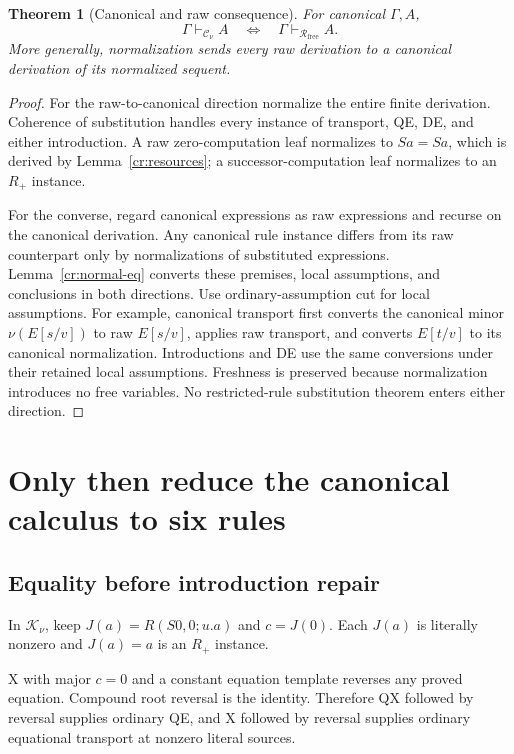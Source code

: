 \documentclass[11pt]{article}
\newtheorem{theorem}{Theorem}[section]
\theoremstyle{definition}\newtheorem{definition}[theorem]{Definition}
\newcommand{\Rfree}{\mathcal R_{\mathrm{free}}}
\newcommand{\Cnorm}{\mathcal C_\nu}
\newcommand{\Knorm}{\mathcal K_\nu}
\begin{document}
\begin{theorem}[Canonical and raw consequence]\label{cr:canonical-equiv}
For canonical \(\Gamma,A\),
\[
\Gamma\vdash_{\Cnorm}A
\quad\Longleftrightarrow\quad
\Gamma\vdash_{\Rfree}A.
\]
More generally, normalization sends every raw derivation to a canonical derivation of its normalized sequent.
\end{theorem}
\begin{proof}
For the raw-to-canonical direction normalize the entire finite derivation. Coherence of substitution handles every instance of transport, QE, DE, and either introduction. A raw zero-computation leaf normalizes to \(Sa=Sa\), which is derived by Lemma~\ref{cr:resources}; a successor-computation leaf normalizes to an \(R_+\) instance.

For the converse, regard canonical expressions as raw expressions and recurse on the canonical derivation. Any canonical rule instance differs from its raw counterpart only by normalizations of substituted expressions. Lemma~\ref{cr:normal-eq} converts these premises, local assumptions, and conclusions in both directions. Use ordinary-assumption cut for local assumptions. For example, canonical transport first converts the canonical minor \(\nu(E[s/v])\) to raw \(E[s/v]\), applies raw transport, and converts \(E[t/v]\) to its canonical normalization. Introductions and DE use the same conversions under their retained local assumptions. Freshness is preserved because normalization introduces no free variables. No restricted-rule substitution theorem enters either direction.
\end{proof}

\section{Only then reduce the canonical calculus to six rules}

\subsection{Equality before introduction repair}

In \(\Knorm\), keep \(J(a)=R(S0,0;u.a)\) and \(c=J(0)\). Each \(J(a)\) is literally nonzero and \(J(a)=a\) is an \(R_+\) instance.

X with major \(c=0\) and a constant equation template reverses any proved equation. Compound root reversal is the identity. Therefore QX followed by reversal supplies ordinary QE, and X followed by reversal supplies ordinary equational transport at nonzero literal sources.
\end{document}
